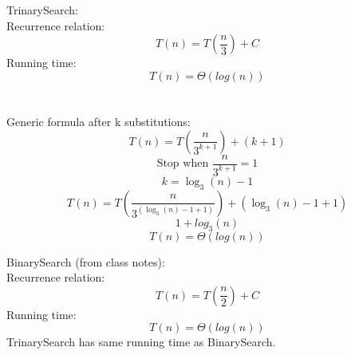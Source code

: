 \documentclass[14pt]{extarticle}
\begin{document}
TrinarySearch: \\
Recurrence relation:
$$T(n) = T\left(\frac{n}{3}\right) + C$$
Running time:
$$T(n) = \Theta(log(n))$$ \\ \\
Generic formula after k substitutions:
\begin{equation}
T(n) = T\left(\frac{n}{3^{k+1}}\right) + (k + 1)
\end{equation}
$$\text{Stop when } \frac{n}{3^{k+1}} = 1$$
$$k = \log_3(n) - 1$$
\begin{equation}
T(n) = T\left(\frac{n}{3^{(\log_3(n) - 1 + 1)}}\right) + (\log_3(n) - 1 + 1)
\end{equation}
$$1 + log_3(n)$$
$$T(n) = \Theta(log(n))$$


BinarySearch (from class notes): \\ 
Recurrence relation:
$$T(n) = T\left(\frac{n}{2}\right) + C$$
Running time:
$$T(n) = \Theta(log(n))$$
TrinarySearch has same running time as BinarySearch.
\end{document}
